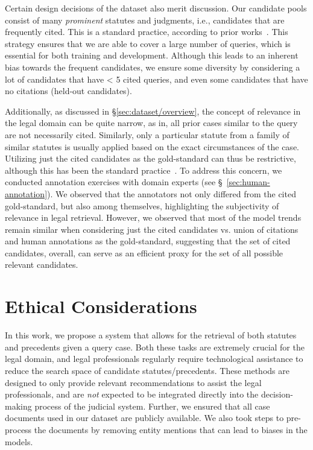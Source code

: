 \noindent Certain design decisions of the dataset also merit discussion. Our candidate pools consist of many \textit{prominent} statutes and judgments, i.e., candidates that are frequently cited. This is a standard practice, according to prior works~\citep{paul2022ilsi,joshi2023ucreat}. This strategy ensures that we are able to cover a large number of queries, which is essential for both training and development. Although this leads to an inherent bias towards the frequent candidates, we ensure some diversity by considering a lot of candidates that have < 5 cited queries, and even some candidates that have no citations (held-out candidates). 

\noindent Additionally, as discussed in \S\ref{sec:dataset/overview}, the concept of relevance in the legal domain can be quite narrow, as in, all prior cases similar to the query are not necessarily cited. Similarly, only a particular statute from a family of similar statutes is usually applied based on the exact circumstances of the case. Utilizing just the cited candidates as the gold-standard can thus be restrictive, although this has been the standard practice~\citep{paul2022ilsi,joshi2023ucreat,li2024coliee2024}. To address this concern, we conducted annotation exercises with domain experts (see \S~\ref{sec:human-annotation}). We observed that the annotators not only differed from the cited gold-standard, but also among themselves, highlighting the subjectivity of relevance in legal retrieval. However, we observed that most of the model trends remain similar when considering just the cited candidates vs. union of citations and human annotations as the gold-standard, suggesting that the set of cited candidates, overall, can serve as an efficient proxy for the set of all possible relevant candidates.


\section*{Ethical Considerations}

\noindent In this work, we propose a system that allows for the retrieval of both statutes and precedents given a query case. Both these tasks are extremely crucial for the legal domain, and legal professionals regularly require technological assistance to reduce the search space of candidate statutes/precedents. These methods are designed to only provide relevant recommendations to assist the legal professionals, and are \textit{not} expected to be integrated directly into the decision-making process of the judicial system. 
Further, we ensured that all case documents used in our dataset \ilpcsr{} are publicly available. We also took steps to pre-process the documents by removing entity mentions that can lead to biases in the models.

